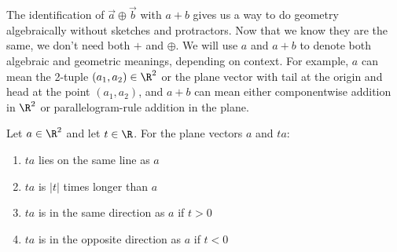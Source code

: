 \begin{note}
    The identification of $\vec{a} \oplus \vec{b}$ with $a + b$ gives us a way to do geometry algebraically without sketches and protractors. Now that we know they are the same, we don't need both $+$ and $\oplus$. We will use $a$ and $a + b$ to denote both algebraic and geometric meanings, depending on context. For example, $a$ can mean the 2-tuple $(a_1, a_2) \in \R^2$ or the plane vector with tail at the origin and head at the point $(a_1, a_2)$, and $a + b$ can mean either componentwise addition in $\R^2$ or parallelogram-rule addition in the plane.
\end{note}



\begin{proposition}\label{prop:scalar-mult-geometry}
    Let $a \in \R^2$ and let $t \in \R$. For the plane vectors $a$ and $ta$:
    \begin{enumerate}[label=\roman*.]
        \item $ta$ lies on the same line as $a$
        \item $ta$ is $|t|$ times longer than $a$
        \item $ta$ is in the same direction as $a$ if $t > 0$
        \item $ta$ is in the opposite direction as $a$ if $t < 0$
    \end{enumerate}
\end{proposition}

